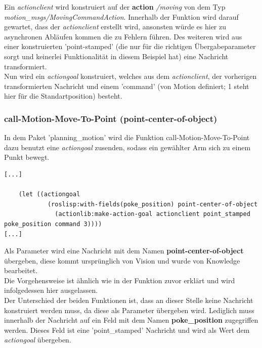 \documentclass{suturo}
\begin{document}
Ein \textit{actionclient} wird konstruiert auf der \textbf{action} \textit{/moving} von dem Typ \\
 \textit{motion\_msgs/MovingCommandAction}. Innerhalb der Funktion wird darauf gewartet, dass der \textit{actionclient} erstellt wird, ansonsten würde es hier zu asynchronen Abläufen kommen die zu Fehlern führen. 
Des weiteren wird aus einer konstruierten 'point-stamped' (die nur für die richtigen Übergabeparameter sorgt und keinerlei Funktionalität in diesem Beispiel hat) eine Nachricht transformiert. \\

Nun wird ein \textit{actiongoal} konstruiert, welches aus dem \textit{actionclient}, der vorherigen transformierten Nachricht und einem 'command' (von Motion definiert; 1 steht hier für die Standartposition) besteht.

\subsubsection{call-Motion-Move-To-Point (point-center-of-object)}

In dem Paket 'planning\_motion' wird die Funktion call-Motion-Move-To-Point dazu benutzt eine \textit{actiongoal} zusenden, sodass ein gewählter Arm sich zu einem Punkt bewegt.

\noindent
\begin{minipage}{\linewidth}
 
\lstset{language=PHP}
\begin{lstlisting}
[...]

    (let ((actiongoal
            (roslisp:with-fields(poke_position) point-center-of-object
              (actionlib:make-action-goal actionclient point_stamped poke_position command 3))))
[...]

\end{lstlisting}
\end{minipage}


Als Parameter wird eine Nachricht mit dem Namen \textbf{point-center-of-object} übergeben, diese kommt ursprünglich von Vision und wurde von Knowledge bearbeitet.\\
 Die Vorgehensweise ist ähnlich wie in der Funktion zuvor erklärt und wird infolgedessen hier ausgelassen.\\

 Der Unterschied der beiden Funktionen ist, dass an dieser Stelle keine Nachricht konstruiert werden muss, da diese als Parameter übergeben wird. Lediglich muss innerhalb der Nachricht auf ein Feld mit dem Namen \textbf{poke\_position} zugegriffen werden. Dieses Feld ist eine 'point\_stamped' Nachricht und wird als Wert dem \textit{actiongoal} übergeben.
\end{document}
